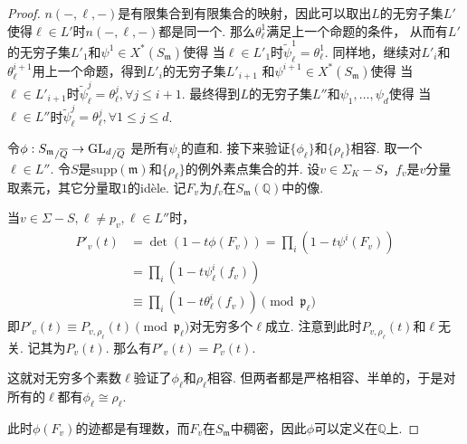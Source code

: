 \begin{proof}
    $n(-,\ell,-)$是有限集合到有限集合的映射，因此可以取出$L$的无穷子集$L'$使得$\ell\in L'$时$n(-,\ell,-)$都是同一个.
    那么${\theta_{\ell}^{1}}$满足上一个命题的条件，
    从而有$L'$的无穷子集$L'_1$和$\psi^1\in X^{*}(S_{\mathfrak{m}})$使得
    当$\ell\in L'_1$时$\tilde{\psi}^1_{\ell} = \theta_{\ell}^{1}$.
    同样地，继续对$L'_i$和${\theta_{\ell}^{i+1}}$用上一个命题，得到$L'_{i}$的无穷子集$L'_{i+1}$
    和$\psi^{i+1}\in X^{*}(S_{\mathfrak{m}})$使得
    当$\ell\in L'_{i+1}$时$\tilde{\psi}^j_{\ell} = \theta_{\ell}^{j},\forall j\leq i+1$.
    最终得到$L$的无穷子集$L''$和$\psi_1,\ldots,\psi_d$使得
    当$\ell\in L''$时$\tilde{\psi}^j_{\ell} = \theta_{\ell}^{j},\forall 1\leq j\leq d$.

    令$\phi:{S_{\mathfrak{m}}}_{/\overline{Q}}\to {\mathrm{GL}_d}_{/\overline{Q}}$
    是所有$\psi_i$的直和. 接下来验证$\{\phi_{\ell}\}$和$\{\rho_{\ell}\}$相容.
    取一个$\ell\in L''$.
    令$S$是$\mathrm{supp}(\mathfrak{m})$和$\{\rho_{\ell}\}$的例外素点集合的并.
    设$v\in \Sigma_{K}-S$，$f_v$是$v$分量取素元，其它分量取$1$的idèle.
    记$F_v$为$f_v$在$S_{\mathfrak{m}}(\mathbb{Q})$中的像.

    当$v\in \Sigma-S,\ell\neq p_v,\ell\in L''$时，
    \begin{align}
        P'_{v}(t)
        &= \det (1-t\phi(F_v))
        = \prod_{i}(1-t\psi^i(F_v))\\
        &= \prod_{i}(1-t\psi_{\ell}^i(f_v))\\
        &\equiv \prod_{i} (1 - t\theta_{\ell}^{i} (f_v))\pmod{\mathfrak{p}_{\ell}} 
    \end{align}
    即$P'_v(t)\equiv P_{v,\rho_{\ell}}(t) \pmod{\mathfrak{p}_{\ell}}$对无穷多个$\ell$成立.
    注意到此时$P_{v,\rho_{\ell}}(t)$和$\ell$无关. 记其为$P_{v}(t)$.
    那么有$P'_v(t)=P_v(t)$.

    这就对无穷多个素数$\ell$验证了$\phi_{\ell}$和$\rho_{\ell}$相容.
    但两者都是严格相容、半单的，于是对所有的$\ell$都有$\phi_{\ell}\cong \rho_{\ell}$.

    此时$\phi(F_v)$的迹都是有理数，而$F_v$在$S_{\mathfrak{m}}$中稠密，因此$\phi$可以定义在$\mathbb{Q}$上.
\end{proof}

